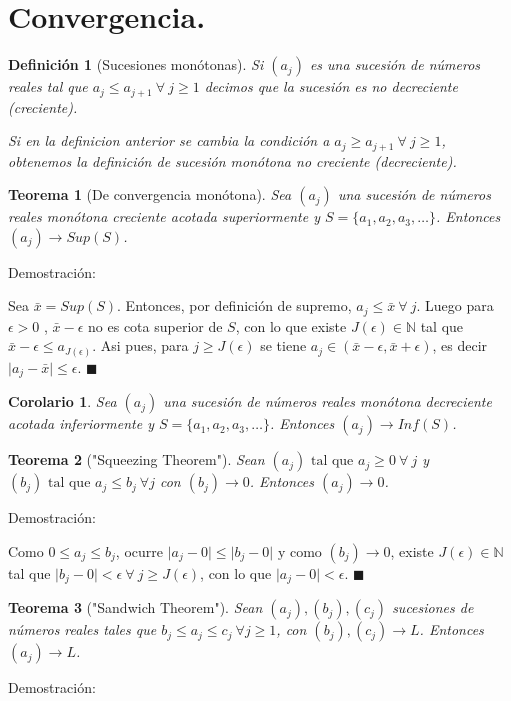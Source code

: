 \documentclass[12pt]{book}
\newcommand\N{{\mathbb N}}
\providecommand{\abs}[1]{\lvert#1\rvert}
\newtheorem{teo}{Teorema}[section]
\newtheorem{defi}{Definición}[section]
\newtheorem{coro}{Corolario}[section]
\begin{document}
\section{Convergencia.}
\begin{defi}[Sucesiones monótonas]\rm
Si $(a_j)$ es una sucesión de números reales tal que $a_j \le a_{j+1} \ \forall \ j \ge 1$ decimos que la sucesión es no decreciente (creciente).

Si en la definicion anterior se cambia la condición a $a_j \ge a_{j+1} \ \forall \ j \ge 1$, obtenemos la definición de sucesión monótona no creciente (decreciente).
\end{defi}
\begin{teo}[De convergencia monótona]\label{ConvergenciaMonotona}\rm
Sea $(a_j)$ una sucesión de números reales monótona creciente acotada superiormente y $S=\{a_1,a_2,a_3, \dots \}$. Entonces $(a_j) \rightarrow Sup(S)$.
\end{teo}
Demostración:

Sea $\bar{x}=Sup(S)$. Entonces, por definición de supremo, $a_j \le \bar{x} \ \forall \ j$. Luego para $\epsilon >0$ , $\bar{x}-\epsilon$ no es cota superior de $S$, con lo que existe $J(\epsilon) \in \N$ tal que $\bar{x}-\epsilon \le a_{J(\epsilon)}$. Asi pues, para $j \ge J(\epsilon)$ se tiene $a_j \in (\bar{x}-\epsilon,\bar{x}+\epsilon)$, es decir $\abs{a_j-\bar{x}} \le \epsilon$. $\blacksquare$
\begin{coro}\rm
Sea $(a_j)$ una sucesión de números reales monótona decreciente acotada inferiormente y $S=\{a_1,a_2,a_3, \dots \}$. Entonces $(a_j) \rightarrow Inf(S)$.
\end{coro}
\begin{teo}["Squeezing Theorem"]\label{squeezing}\rm
Sean $(a_j) \mbox{ tal que } a_j \ge 0 \ \forall \ j$ y $(b_j) \mbox{ tal que } a_j \le b_j \ \forall j$ con $(b_j) \rightarrow 0$. Entonces $(a_j) \rightarrow 0$.
\end{teo}
Demostración:

Como $0 \le a_j \le b_j$, ocurre $\abs{a_j-0} \le \abs{b_j-0} \mbox{ y como } (b_j) \rightarrow 0$, existe $J(\epsilon) \in \N$ tal que $\abs{b_j-0}<\epsilon \ \forall \ j \ge J(\epsilon)$, con lo que $\abs{a_j-0}<\epsilon$. $\blacksquare$
\begin{teo}["Sandwich Theorem"]\rm
Sean $(a_j),(b_j),(c_j)$ sucesiones de números reales tales que $b_j \le a_j \le c_j \ \forall j\ge 1$, con $(b_j),(c_j) \rightarrow L$. Entonces $(a_j) \rightarrow L$.
\end{teo}
Demostración:
\end{document}
